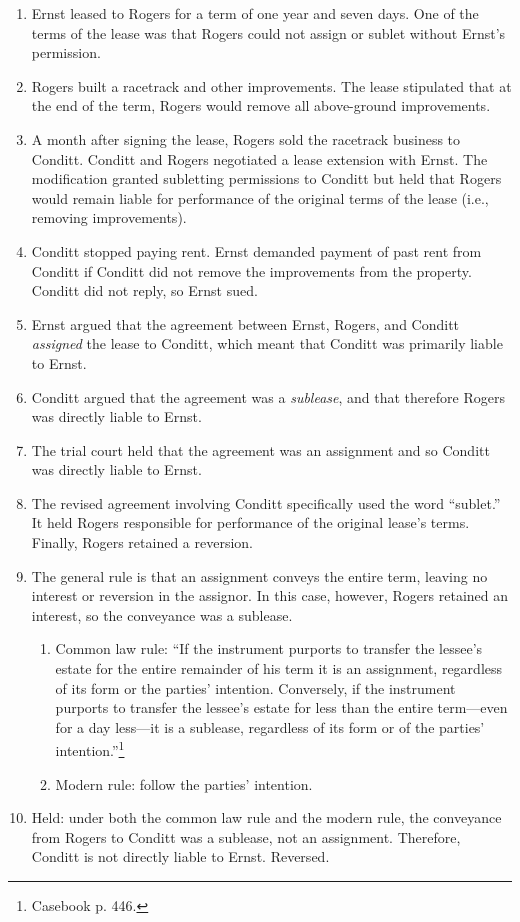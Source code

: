 \begin{enumerate}
    \item Ernst leased to Rogers for a term of one year and seven days. One of 
    the terms of the lease was that Rogers could not assign or sublet without 
    Ernst's permission.
    \item Rogers built a racetrack and other improvements. The lease 
    stipulated that at the end of the term, Rogers would remove all 
    above-ground improvements.
    \item A month after signing the lease, Rogers sold the racetrack business 
    to Conditt. Conditt and Rogers negotiated a lease extension with Ernst. 
    The modification granted subletting permissions to Conditt but held that 
    Rogers would remain liable for performance of the original terms of the 
    lease (i.e., removing improvements).
    \item Conditt stopped paying rent. Ernst demanded payment of past rent 
    from Conditt if Conditt did not remove the improvements from the property. 
    Conditt did not reply, so Ernst sued.
    \item Ernst argued that the agreement between Ernst, Rogers, and Conditt 
    \emph{assigned} the lease to Conditt, which meant that Conditt was 
    primarily liable to Ernst.
    \item Conditt argued that the agreement was a \emph{sublease}, and that 
    therefore Rogers was directly liable to Ernst.
    \item The trial court held that the agreement was an assignment and so 
    Conditt was directly liable to Ernst.
    \item The revised agreement involving Conditt specifically used the word 
    ``sublet.'' It held Rogers responsible for performance of the original 
    lease's terms. Finally, Rogers retained a reversion.
    \item The general rule is that an assignment conveys the entire term, 
    leaving no interest or reversion in the assignor. In this case, however, 
    Rogers retained an interest, so the conveyance was a sublease.
    \begin{enumerate}
        \item Common law rule: ``If the instrument purports to transfer the 
        lessee's estate for the entire remainder of his term it is an 
        assignment, regardless of its form or the parties' intention. 
        Conversely, if the instrument purports to transfer the lessee's estate 
        for less than the entire term---even for a day less---it is a 
        sublease, regardless of its form or of the parties' 
        intention.''\footnote{Casebook p. 446.}
        \item Modern rule: follow the parties' intention.
    \end{enumerate}
    \item Held: under both the common law rule and the modern rule, the 
    conveyance from Rogers to Conditt was a sublease, not an assignment. 
    Therefore, Conditt is not directly liable to Ernst. Reversed.
\end{enumerate}

